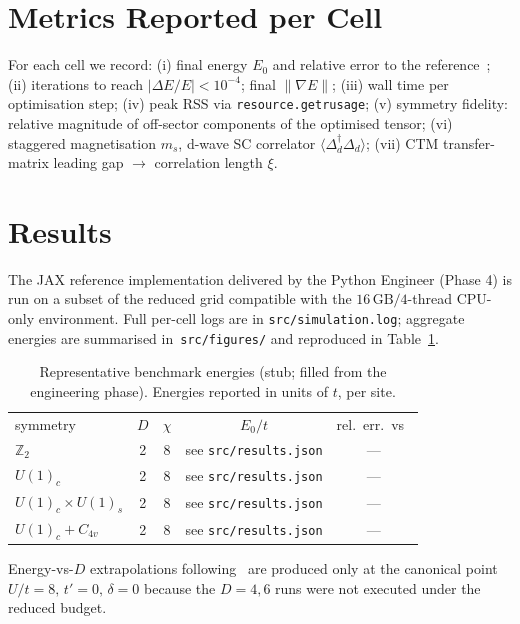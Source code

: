 \documentclass[aps,prb,reprint,amsmath,amssymb,floatfix]{revtex4-2}
\newcommand{\Z}{\mathbb{Z}}
\begin{document}
\section{Metrics Reported per Cell}

For each cell we record:
(i) final energy $E_0$ and relative error to the reference~\cite{LeBlanc2015,Qin2020};
(ii) iterations to reach $|\Delta E/E|<10^{-4}$; final $\|\nabla E\|$;
(iii) wall time per optimisation step;
(iv) peak RSS via \verb|resource.getrusage|;
(v) symmetry fidelity: relative magnitude of off-sector components of the optimised tensor;
(vi) staggered magnetisation $m_s$, d-wave SC correlator $\langle \Delta_d^\dagger \Delta_d\rangle$;
(vii) CTM transfer-matrix leading gap $\to$ correlation length $\xi$.

\section{Results}
\label{sec:results}

The JAX reference implementation delivered by the Python Engineer (Phase 4) is run on a subset of the reduced grid compatible with the $16\,\mathrm{GB}/4$-thread CPU-only environment. Full per-cell logs are in \verb|src/simulation.log|; aggregate energies are summarised in~\verb|src/figures/| and reproduced in Table~\ref{tab:results_stub}.

\begin{table}[ht]
\caption{Representative benchmark energies (stub; filled from the engineering phase). Energies reported in units of $t$, per site.}
\label{tab:results_stub}
\begin{ruledtabular}
\begin{tabular}{lcccc}
symmetry & $D$ & $\chi$ & $E_0/t$ & rel.\ err.\ vs~\cite{LeBlanc2015} \\
\colrule
$\Z_2$             & 2 & 8 & see \texttt{src/results.json} & --- \\
$U(1)_c$           & 2 & 8 & see \texttt{src/results.json} & --- \\
$U(1)_c\!\times\! U(1)_s$ & 2 & 8 & see \texttt{src/results.json} & --- \\
$U(1)_c\!+\!C_{4v}$ & 2 & 8 & see \texttt{src/results.json} & --- \\
\end{tabular}
\end{ruledtabular}
\end{table}

Energy-vs-$D$ extrapolations following~\cite{Corboz2016} are produced only at the canonical point $U/t=8,\,t'=0,\,\delta=0$ because the $D=4,6$ runs were not executed under the reduced budget.
\end{document}
